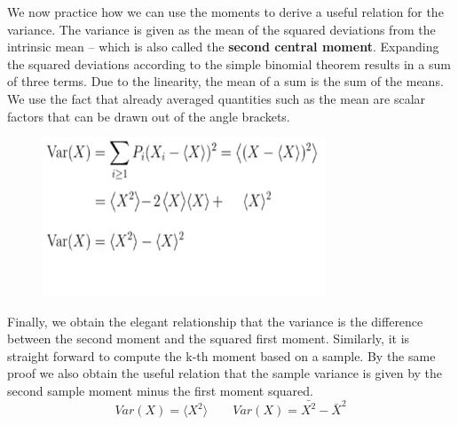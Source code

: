 \documentclass[12pt, a4paper]{scrartcl}
\begin{document}
We now practice how we can use the moments to derive a useful relation for the variance.
The variance is given as the mean of the squared deviations from the intrinsic mean – which is also called the \textbf{second central moment}.
Expanding the squared deviations according to the simple binomial theorem results in a sum of three terms.  Due to the linearity, the mean of a sum is the sum of the means. 
We use the fact that already averaged quantities such as the mean are scalar factors that can be drawn out of the angle brackets.
\begin{figure}[H]
	\centering
	\includegraphics[width=0.75\textwidth]{2_9.png}
\end{figure}
Finally, we obtain the elegant relationship that the variance is the difference between the second moment and the squared first moment.
Similarly, it is straight forward to compute the k-th moment based on a sample.
By the same proof we also obtain the useful relation that the sample variance is given by the second sample moment minus the first moment squared.\\

\begin{equation*}\boxed{Var(X) = \langle X^2 \rangle \qquad Var(X) = \bar{X^2} - \bar{X}^2}\end{equation*}

\\
\end{document}
